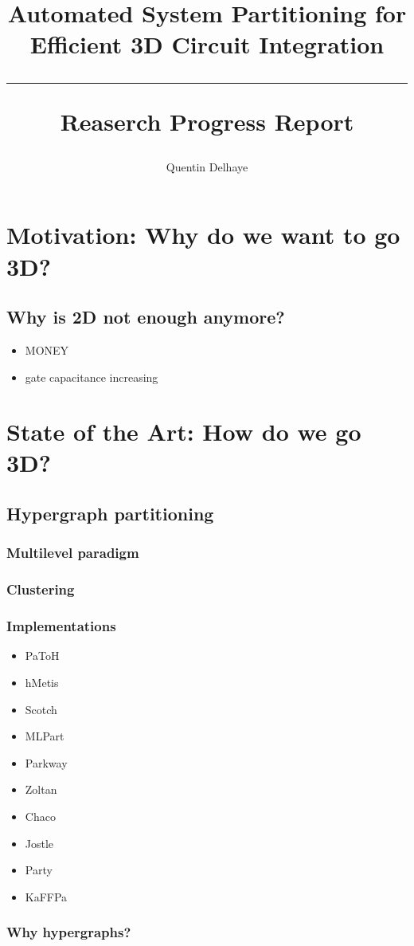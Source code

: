 \documentclass[12pt,a4paper]{article}
\author{Quentin Delhaye}
\title{Automated System Partitioning for Efficient 3D Circuit Integration \\ \vspace{.5em} \hrule \vspace{.5em} \large Reaserch Progress Report}
\theoremstyle{customdef}
\begin{document}
\maketitle
\tableofcontents
\citet{Ihler1993}

\section{Motivation: Why do we want to go 3D?}
\subsection{Why is 2D not enough anymore?}
\begin{itemize}
	\item MONEY
	\item gate capacitance increasing
\end{itemize}


\section{State of the Art: How do we go 3D?}
\subsection{Hypergraph partitioning}
\subsubsection{Multilevel paradigm}
\subsubsection{Clustering}
\subsubsection{Implementations}
\begin{itemize}
	\item PaToH
	\item hMetis
	\item Scotch
	\item MLPart
	\item Parkway
	\item Zoltan
	\item Chaco
	\item Jostle
	\item Party
	\item KaFFPa
\end{itemize}
\subsubsection{Why hypergraphs?}
\end{document}

